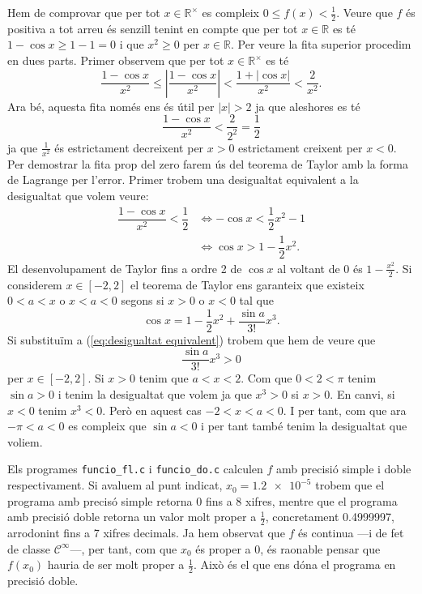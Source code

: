 \documentclass[12pt]{article}
\newcommand{\abs}[1]{\left\lvert#1\right\rvert}
\newcommand{\R}{\mathbb{R}}
\begin{document}
Hem de comprovar que per tot \( x \in \R^{\times} \) es compleix \( 0 \leq f(x) < \frac{1}{2} \).
Veure que \( f \) és positiva a tot arreu és senzill tenint en compte que per tot \( x \in \R \) es té \( 1 - \cos{x} \geq 1 - 1 = 0 \) i que \( x^2 \geq 0 \) per \( x \in \R \). Per veure la fita superior procedim en dues parts.	Primer observem que per tot \( x \in \R^{\times} \) es té
\begin{equation*}
	\dfrac{1 - \cos{x}}{x^2} \leq \abs{\dfrac{1 - \cos{x}}{x^2}} < \dfrac{1 + \abs{\cos{x}}}{x^2} < \dfrac{2}{x^2}.
\end{equation*}
Ara bé, aquesta fita només ens és útil per \( \abs{x} > 2 \) ja que aleshores es té
\begin{equation*}
	\dfrac{1 - \cos{x}}{x^2} < \dfrac{2}{2^2} = \dfrac{1}{2}
\end{equation*}
ja que \( \frac{1}{x^2} \) és estrictament decreixent per \( x > 0 \) estrictament creixent per \( x < 0 \). Per demostrar la fita prop del zero farem ús del teorema de Taylor amb la forma de Lagrange per l'error. Primer trobem una desigualtat equivalent a la desigualtat que volem veure:
\begin{align*}
\dfrac{1 - \cos{x}}{x^2} < \dfrac{1}{2} & \iff -\cos{x} < \dfrac{1}{2}x^2 - 1 \\
& \iff \cos{x} > 1 - \dfrac{1}{2}x^2. \label{eq:desigualtat equivalent} \tag{$\ast$}
\end{align*}
El desenvolupament de Taylor fins a ordre 2 de \( \cos{x} \) al voltant de 0 és \( 1 - \frac{x^2}{2} \). Si considerem \( x \in [-2,2] \) el teorema de Taylor ens garanteix que existeix \( 0 < a < x \) o \( x < a < 0 \) segons si \( x > 0 \) o \( x < 0 \) tal que 
\begin{equation*}
\cos{x} = 1 - \dfrac{1}{2}x^2 + \dfrac{\sin{a}}{3!} x^3.
\end{equation*}
Si substituïm a (\ref{eq:desigualtat equivalent}) trobem que hem de veure que 
\begin{equation*}
\dfrac{\sin{a}}{3!}x^3 > 0 
\end{equation*}
per \( x \in [-2,2] \). Si \( x >0 \) tenim que \( a < x < 2 \). Com que \( 0 < 2 < \pi \) tenim \( \sin{a} > 0 \) i tenim la desigualtat que volem ja que \( x^3 > 0 \) si \( x > 0 \). En canvi, si \( x < 0 \) tenim \( x^3 < 0 \). Però en aquest cas \( -2 < x < a < 0 \). I per tant, com que ara \( -\pi < a < 0 \) es compleix que \( \sin{a} < 0 \) i per tant també tenim la desigualtat que voliem.

Els programes \texttt{funcio\_fl.c} i \texttt{funcio\_do.c} calculen \( f \) amb precisió simple i doble respectivament. Si avaluem al punt indicat, \( x_0 = \num{1.2e-5} \) trobem que el programa amb precisó simple retorna 0 fins a 8 xifres, mentre que el programa amb precisió doble retorna un valor molt proper a \( \frac{1}{2} \), concretament \num{0.4999997}, arrodonint fins a 7 xifres decimals. Ja hem observat que \( f \) és continua ---i de fet de classe \( \mathcal{C}^{\infty} \)---, per tant, com que \( x_0 \) és proper a 0, és raonable pensar que \( f(x_0) \) hauria de ser molt proper a \( \frac{1}{2} \). Això és el que ens dóna el programa en precisió doble. 
\end{document}
